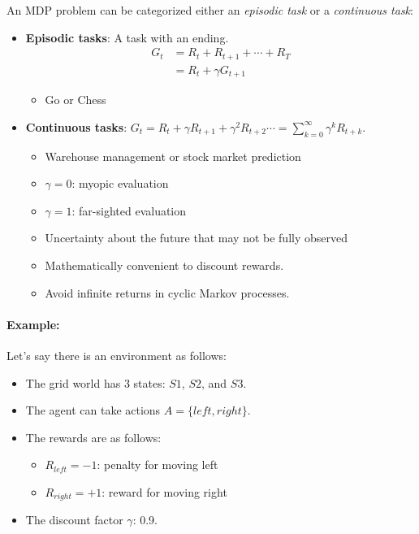 An MDP problem can be categorized either an \textit{episodic task} or a \textit{continuous task}: 
\begin{itemize}
	\item \textbf{Episodic tasks}: A task with an ending.  
		\begin{align*}
			G_t &= R_{t} + R_{t+1} + \cdots + R_{T}\\
				&= R_{t}+\gamma G_{t+1}
		\end{align*}
		\begin{itemize}
			\item \eg Go or Chess
		\end{itemize}
	\item \textbf{Continuous tasks}: $G_t = R_{t} + \gamma R_{t+1} +  \gamma^2 R_{t+2} \cdots =\sum_{k=0}^{\infty} \gamma^{k} R_{t+k}.$
		\begin{itemize}
			\item \eg Warehouse management or stock market prediction
			\item $\gamma=0$: myopic evaluation
			\item $\gamma=1$: far-sighted evaluation
			\item Uncertainty about the future that may not be fully observed
			\item Mathematically convenient to discount rewards. 
			\item Avoid infinite returns in cyclic Markov processes.
		\end{itemize}
\end{itemize}

\paragraph{Example:} Let's say there is an environment as follows:
\begin{itemize}
	\item The grid world has 3 states: $S1$, $S2$, and $S3$.
	\item The agent can take actions $A=\{left,right\}$.
	\item The rewards are as follows:
		\begin{itemize}
			\item $R_{left}=-1$: penalty for moving left
			\item $R_{right}=+1$: reward for moving right
		\end{itemize}
	\item The discount factor $\gamma$: 0.9.
\end{itemize}

